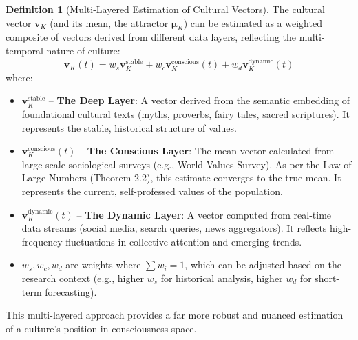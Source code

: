 \documentclass[11pt,a4paper]{article}
\theoremstyle{definition}
\newtheorem{definition}{Definition}[section]
\theoremstyle{remark}
\begin{document}
\begin{definition}[Multi-Layered Estimation of Cultural Vectors]
The cultural vector \(\mathbf{v}_K\) (and its mean, the attractor \(\boldsymbol{\mu}_K\)) can be estimated as a weighted composite of vectors derived from different data layers, reflecting the multi-temporal nature of culture:
\begin{equation}
\hat{\mathbf{v}}_K(t) = w_s \mathbf{v}_K^{\text{stable}} + w_c \mathbf{v}_K^{\text{conscious}}(t) + w_d \mathbf{v}_K^{\text{dynamic}}(t)
\end{equation}
where:
\begin{itemize}
    \item \(\mathbf{v}_K^{\text{stable}}\) -- \textbf{The Deep Layer}: A vector derived from the semantic embedding of foundational cultural texts (myths, proverbs, fairy tales, sacred scriptures). It represents the stable, historical structure of values.
    \item \(\mathbf{v}_K^{\text{conscious}}(t)\) -- \textbf{The Conscious Layer}: The mean vector calculated from large-scale sociological surveys (e.g., World Values Survey). As per the Law of Large Numbers (Theorem 2.2), this estimate converges to the true mean. It represents the current, self-professed values of the population.
    \item \(\mathbf{v}_K^{\text{dynamic}}(t)\) -- \textbf{The Dynamic Layer}: A vector computed from real-time data streams (social media, search queries, news aggregators). It reflects high-frequency fluctuations in collective attention and emerging trends.
    \item \(w_s, w_c, w_d\) are weights where \(\sum w_i = 1\), which can be adjusted based on the research context (e.g., higher \(w_s\) for historical analysis, higher \(w_d\) for short-term forecasting).
\end{itemize}
This multi-layered approach provides a far more robust and nuanced estimation of a culture's position in consciousness space.
\end{definition}
\end{document}
